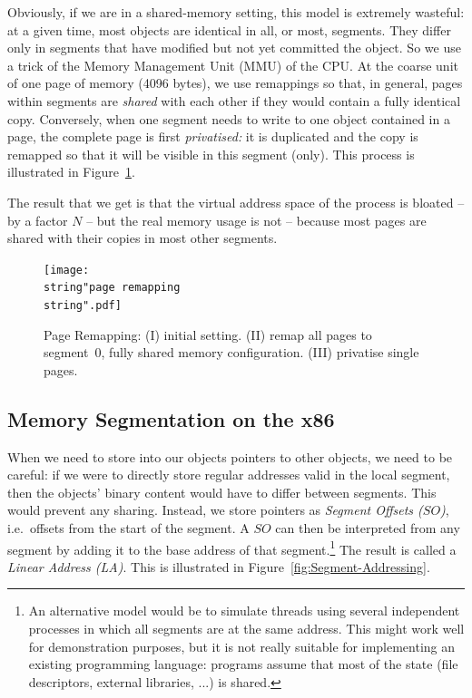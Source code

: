 \documentclass{sigplanconf}
\begin{document}
Obviously, if we are in a shared-memory setting, this model is extremely
wasteful: at a given time, most objects are identical in all, or most,
segments.  They differ only in segments that have modified but not yet
committed the object.  So we use a trick of the Memory Management Unit
(MMU) of the CPU.  At the coarse unit of one page of memory (4096
bytes), we use remappings so that, in general, pages within segments are
\emph{shared} with each other if they would contain a fully identical
copy.  Conversely, when one segment needs to write to one object
contained in a page, the complete page is first \emph{privatised:} it is
duplicated and the copy is remapped so that it will be visible in this
segment (only).  This process is illustrated in
Figure~\ref{fig:Page-Remapping}.

The result that we get is that the virtual address space of the process
is bloated -- by a factor $N$ -- but the real memory usage is not --
because most pages are shared with their copies in most other segments.

\begin{figure}[h]
  \centering
  \texttt{[image: \\string"page remapping\\string".pdf]}
  \caption{Page Remapping: (I) initial setting. (II) remap all pages to
    segment~0, fully shared memory configuration. (III) privatise single
    pages.\label{fig:Page-Remapping}}
\end{figure}


\subsection{Memory Segmentation on the x86}

When we need to store into our objects pointers to other objects, we
need to be careful: if we were to directly store regular addresses valid
in the local segment, then the objects' binary content would have to differ
between segments.  This would prevent any sharing.  Instead, we store
pointers as \emph{Segment Offsets ($SO$)}, i.e.\ offsets from the start
of the segment.  A $SO$ can then be interpreted from any segment by
adding it to the base address of that segment.\footnote{An alternative
model would be to simulate threads using several independent processes
in which all segments are at the same address.  This might work well for
demonstration purposes, but it is not really suitable for implementing
an existing programming language: programs assume that most of the state
(file descriptors, external libraries, ...) is shared.} The result is
called a \emph{Linear Address (LA)}. This is illustrated in
Figure~\ref{fig:Segment-Addressing}.
\end{document}

